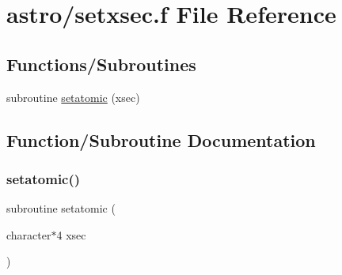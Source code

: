 \hypertarget{setxsec_8f}{}\section{astro/setxsec.f File Reference}
\label{setxsec_8f}
\subsection*{Functions/\+Subroutines}
\begin{DoxyCompactItemize}
\item 
subroutine \hyperlink{setxsec_8f_a3492d65f4833cd0292c9757c9f39d4ee}{setatomic} (xsec)
\end{DoxyCompactItemize}


\subsection{Function/\+Subroutine Documentation}
\mbox{\label{setxsec_8f_a3492d65f4833cd0292c9757c9f39d4ee}} 
\subsubsection{\texorpdfstring{setatomic()}{setatomic()}}
{\footnotesize\ttfamily subroutine setatomic (\begin{DoxyParamCaption}\item[{character$\ast$4}]{xsec }\end{DoxyParamCaption})}

